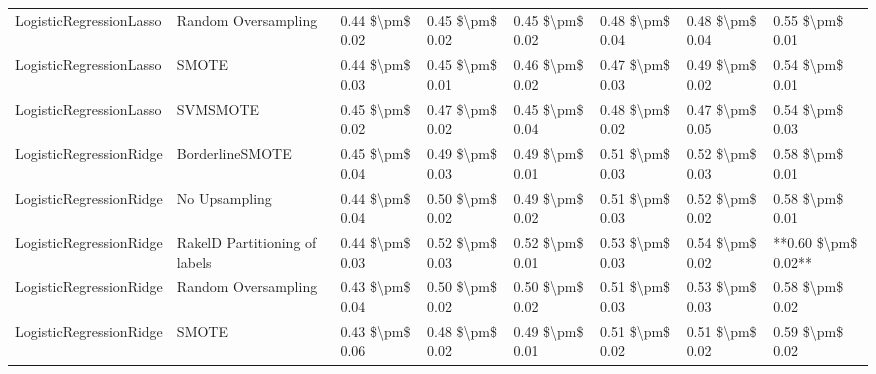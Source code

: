 \begin{tabular}{llllllll}
        LogisticRegressionLasso &           Random Oversampling & 0.44 \$\textbackslash pm\$ 0.02 &           0.45 \$\textbackslash pm\$ 0.02 &       0.45 \$\textbackslash pm\$ 0.02 &        0.48 \$\textbackslash pm\$ 0.04 &                         0.48 \$\textbackslash pm\$ 0.04 &     0.55 \$\textbackslash pm\$ 0.01 \\
        LogisticRegressionLasso &                         SMOTE & 0.44 \$\textbackslash pm\$ 0.03 &           0.45 \$\textbackslash pm\$ 0.01 &       0.46 \$\textbackslash pm\$ 0.02 &        0.47 \$\textbackslash pm\$ 0.03 &                         0.49 \$\textbackslash pm\$ 0.02 &     0.54 \$\textbackslash pm\$ 0.01 \\
        LogisticRegressionLasso &                      SVMSMOTE & 0.45 \$\textbackslash pm\$ 0.02 &           0.47 \$\textbackslash pm\$ 0.02 &       0.45 \$\textbackslash pm\$ 0.04 &        0.48 \$\textbackslash pm\$ 0.02 &                         0.47 \$\textbackslash pm\$ 0.05 &     0.54 \$\textbackslash pm\$ 0.03 \\
        LogisticRegressionRidge &               BorderlineSMOTE & 0.45 \$\textbackslash pm\$ 0.04 &           0.49 \$\textbackslash pm\$ 0.03 &       0.49 \$\textbackslash pm\$ 0.01 &        0.51 \$\textbackslash pm\$ 0.03 &                         0.52 \$\textbackslash pm\$ 0.03 &     0.58 \$\textbackslash pm\$ 0.01 \\
        LogisticRegressionRidge &                 No Upsampling & 0.44 \$\textbackslash pm\$ 0.04 &           0.50 \$\textbackslash pm\$ 0.02 &       0.49 \$\textbackslash pm\$ 0.02 &        0.51 \$\textbackslash pm\$ 0.03 &                         0.52 \$\textbackslash pm\$ 0.02 &     0.58 \$\textbackslash pm\$ 0.01 \\
        LogisticRegressionRidge & RakelD Partitioning of labels & 0.44 \$\textbackslash pm\$ 0.03 &           0.52 \$\textbackslash pm\$ 0.03 &       0.52 \$\textbackslash pm\$ 0.01 &        0.53 \$\textbackslash pm\$ 0.03 &                         0.54 \$\textbackslash pm\$ 0.02 & **0.60 \$\textbackslash pm\$ 0.02** \\
        LogisticRegressionRidge &           Random Oversampling & 0.43 \$\textbackslash pm\$ 0.04 &           0.50 \$\textbackslash pm\$ 0.02 &       0.50 \$\textbackslash pm\$ 0.02 &        0.51 \$\textbackslash pm\$ 0.03 &                         0.53 \$\textbackslash pm\$ 0.03 &     0.58 \$\textbackslash pm\$ 0.02 \\
        LogisticRegressionRidge &                         SMOTE & 0.43 \$\textbackslash pm\$ 0.06 &           0.48 \$\textbackslash pm\$ 0.02 &       0.49 \$\textbackslash pm\$ 0.01 &        0.51 \$\textbackslash pm\$ 0.02 &                         0.51 \$\textbackslash pm\$ 0.02 &     0.59 \$\textbackslash pm\$ 0.02 \\

\end{tabular}
